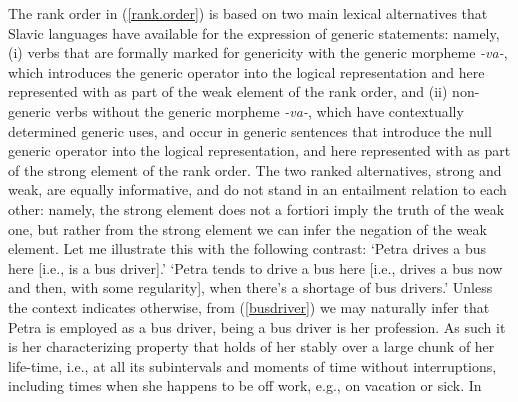 \documentclass[output=paper,colorlinks,citecolor=brown]{langscibook}
\begin{document}
\noindent
The rank order in (\ref{rank.order})
is based on two main lexical alternatives
that Slavic languages have available for the expression of generic statements:
namely, (i) verbs that are formally marked for genericity with the generic morpheme \textit{-va-}, which introduces the generic operator  into the logical representation and here represented with  as part
of the weak element of the rank order,  and (ii) non-generic verbs without the generic morpheme \textit{-va-}, which have contextually determined generic uses, and occur in generic sentences that introduce the null generic operator  into the logical representation, and here represented with  as part of the strong element of the rank order.
The two ranked alternatives, strong and weak,
are equally informative, and do not stand in an entailment relation to each other:
namely, the strong element does not a fortiori imply the truth of the weak one, but rather from
the strong element we can infer the negation of the weak element.
Let me illustrate this with the following contrast:
\ea
{}
\glt `Petra drives a bus here [i.e., is a bus driver].'
\glt `Petra tends to drive a bus here [i.e., drives a bus now and then, with some regularity], when there's a shortage of bus drivers.'
\z
\z
Unless the context indicates otherwise,
from (\ref{busdriver}) we may naturally infer that Petra is employed as a bus driver, being a bus driver is her profession.
As such it is her characterizing property that holds of her stably over a large chunk of her life-time, i.e., at all its subintervals and moments of time without interruptions, including times when she happens to be off work, e.g., on vacation or sick.  In
\end{document}
